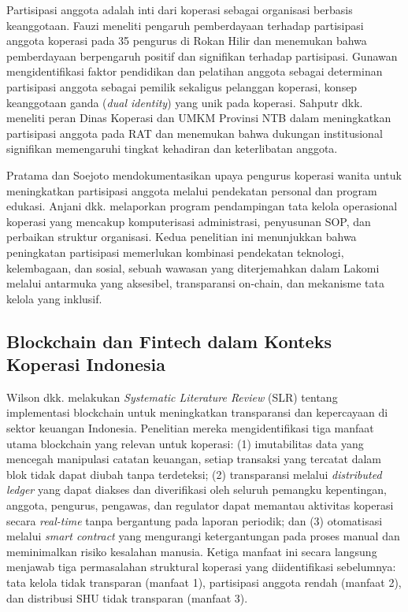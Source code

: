 Partisipasi anggota adalah inti dari koperasi sebagai organisasi berbasis keanggotaan. Fauzi \cite{fauzi2022pengaruh} meneliti pengaruh pemberdayaan terhadap partisipasi anggota koperasi pada 35 pengurus di Rokan Hilir dan menemukan bahwa pemberdayaan berpengaruh positif dan signifikan terhadap partisipasi. Gunawan \cite{gunawan2018faktor} mengidentifikasi faktor pendidikan dan pelatihan anggota sebagai determinan partisipasi anggota sebagai pemilik sekaligus pelanggan koperasi, konsep keanggotaan ganda (\textit{dual identity}) yang unik pada koperasi. Sahputr dkk. \cite{sahputr2024peran} meneliti peran Dinas Koperasi dan UMKM Provinsi NTB dalam meningkatkan partisipasi anggota pada RAT dan menemukan bahwa dukungan institusional signifikan memengaruhi tingkat kehadiran dan keterlibatan anggota.

Pratama dan Soejoto \cite{pratama2015upaya} mendokumentasikan upaya pengurus koperasi wanita untuk meningkatkan partisipasi anggota melalui pendekatan personal dan program edukasi. Anjani dkk. \cite{anjani2023pendampingan} melaporkan program pendampingan tata kelola operasional koperasi yang mencakup komputerisasi administrasi, penyusunan SOP, dan perbaikan struktur organisasi. Kedua penelitian ini menunjukkan bahwa peningkatan partisipasi memerlukan kombinasi pendekatan teknologi, kelembagaan, dan sosial, sebuah wawasan yang diterjemahkan dalam Lakomi melalui antarmuka yang aksesibel, transparansi on-chain, dan mekanisme tata kelola yang inklusif.

\subsection{Blockchain dan Fintech dalam Konteks Koperasi Indonesia}

Wilson dkk. \cite{wilson2024analisis} melakukan \textit{Systematic Literature Review} (SLR) tentang implementasi blockchain untuk meningkatkan transparansi dan kepercayaan di sektor keuangan Indonesia. Penelitian mereka mengidentifikasi tiga manfaat utama blockchain yang relevan untuk koperasi: (1) imutabilitas data yang mencegah manipulasi catatan keuangan, setiap transaksi yang tercatat dalam blok tidak dapat diubah tanpa terdeteksi; (2) transparansi melalui \textit{distributed ledger} yang dapat diakses dan diverifikasi oleh seluruh pemangku kepentingan, anggota, pengurus, pengawas, dan regulator dapat memantau aktivitas koperasi secara \textit{real-time} tanpa bergantung pada laporan periodik; dan (3) otomatisasi melalui \textit{smart contract} yang mengurangi ketergantungan pada proses manual dan meminimalkan risiko kesalahan manusia. Ketiga manfaat ini secara langsung menjawab tiga permasalahan struktural koperasi yang diidentifikasi sebelumnya: tata kelola tidak transparan (manfaat 1), partisipasi anggota rendah (manfaat 2), dan distribusi SHU tidak transparan (manfaat 3).

